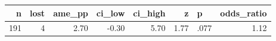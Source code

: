\begin{tabular}{rrrrrrlr}
  \toprule
n & lost & ame\_pp & ci\_low & ci\_high & z & p & odds\_ratio \\ 
  \midrule
191 &   4 & 2.70 & -0.30 & 5.70 & 1.77 & .077 & 1.12 \\ 
   \bottomrule
\end{tabular}
